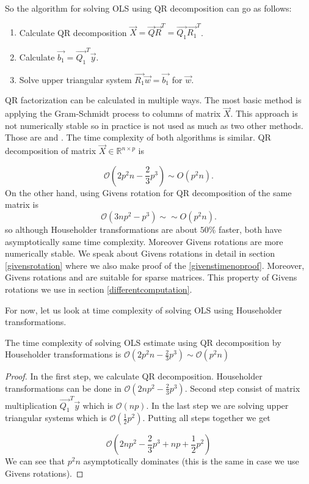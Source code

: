So the algorithm for solving OLS using QR decomposition can go as follows:
\begin{enumerate}
  \item Calculate QR decomposition $\vec{X} = \vec{Q}\vec{R}^T = \vec{Q_1}\vec{R_1}^T$.
  \item Calculate $\vec{b_1} = \vec{Q_1}^T \vec{y}$.
  \item Solve upper triangular system $\vec{R_1}\vec{w} = \vec{b_1}$ for $\vec{w}$.
\end{enumerate}

QR factorization can be calculated in multiple ways. The most basic method is applying the Gram-Schmidt process
to columns of matrix $\vec{X}$. This approach is not numerically stable so in practice is not used as much as two other methods. Those are  and .
The time complexity of both algorithms is similar. QR decomposition of matrix $\vec{X} \in \mathbb{R}^{n \times p}$ is 

\begin{equation} \label{qrtimewhat}
    \mathcal{O}(2p^2n - \frac{2}{3}p^3) \sim {O}(p^2n).
\end{equation}
On the other hand, using Givens rotation for QR decomposition of the same matrix is 
\begin{equation} \label{givenstimenoproof}
    \mathcal{O}(3np^2 - p^3) \sim \sim {O}(p^2n).
\end{equation}
so although Householder transformations are about $50\%$ faster, both have asymptotically same time complexity. Moreover Givens rotations are more numerically stable. 
We speak about Givens rotations in detail in section \ref{givensrotation} where we also make proof of the \eqref{givenstimenoproof}. Moreover, Givens rotations and are suitable for sparse matrices. This property of Givens rotations we use in section \ref{differentcomputation}. 

For now, let us look at time complexity of solving OLS using Householder transformations. 
\begin{observation}
    The time complexity of solving OLS estimate using QR decomposition by Householder transformations is $\mathcal{O}(2p^2n - \frac{2}{3}p^3) \sim \mathcal{O}(p^2n) $
\end{observation}

\begin{proof}
    In the first step, we calculate QR decomposition. Householder transformations can be done in $\mathcal{O}(2np^2 - \frac{2}{3}p^3)$.
    Second step consist of matrix multiplication $\vec{Q_1}^T \vec{y}$ which is $\mathcal{O}(np)$.  In the last step we are solving upper triangular systems which is $\mathcal{O}(\frac{1}{2}p^2)$.
    Putting all steps together we get  

    \begin{equation} \label{time:complexity:ols:qr:householder}
        \mathcal{O}(2np^2 - \frac{2}{3}p^3 + np + \frac{1}{2}p^2)
    \end{equation}
    We can see that $p^2n$ asymptotically dominates (this is the same in case we use Givens rotations).
\end{proof}


